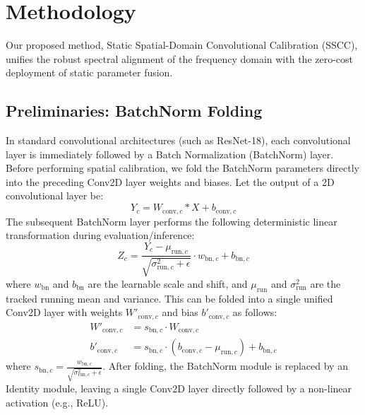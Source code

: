 \documentclass{article}
\theoremstyle{plain}
\theoremstyle{definition}
\theoremstyle{remark}
\begin{document}
\section{Methodology}
\label{submission-methodology}

Our proposed method, Static Spatial-Domain Convolutional Calibration (SSCC), unifies the robust spectral alignment of the frequency domain with the zero-cost deployment of static parameter fusion.

\subsection{Preliminaries: BatchNorm Folding}
In standard convolutional architectures (such as ResNet-18), each convolutional layer is immediately followed by a Batch Normalization (BatchNorm) \cite{ioffe2015batch} layer. Before performing spatial calibration, we fold the BatchNorm parameters directly into the preceding Conv2D layer weights and biases. Let the output of a 2D convolutional layer be:
\begin{equation}
    Y_c = W_{\text{conv}, c} * X + b_{\text{conv}, c}
\end{equation}
The subsequent BatchNorm layer performs the following deterministic linear transformation during evaluation/inference:
\begin{equation}
    Z_c = \frac{Y_c - \mu_{\text{run}, c}}{\sqrt{\sigma^2_{\text{run}, c} + \epsilon}} \cdot w_{\text{bn}, c} + b_{\text{bn}, c}
\end{equation}
where $w_{\text{bn}}$ and $b_{\text{bn}}$ are the learnable scale and shift, and $\mu_{\text{run}}$ and $\sigma^2_{\text{run}}$ are the tracked running mean and variance. This can be folded into a single unified Conv2D layer with weights $W'_{\text{conv}, c}$ and bias $b'_{\text{conv}, c}$ as follows:
\begin{align}
    W'_{\text{conv}, c} &= s_{\text{bn}, c} \cdot W_{\text{conv}, c} \\
    b'_{\text{conv}, c} &= s_{\text{bn}, c} \cdot (b_{\text{conv}, c} - \mu_{\text{run}, c}) + b_{\text{bn}, c}
\end{align}
where $s_{\text{bn}, c} = \frac{w_{\text{bn}, c}}{\sqrt{\sigma^2_{\text{run}, c} + \epsilon}}$. After folding, the BatchNorm module is replaced by an Identity module, leaving a single Conv2D layer directly followed by a non-linear activation (e.g., ReLU).
\end{document}
